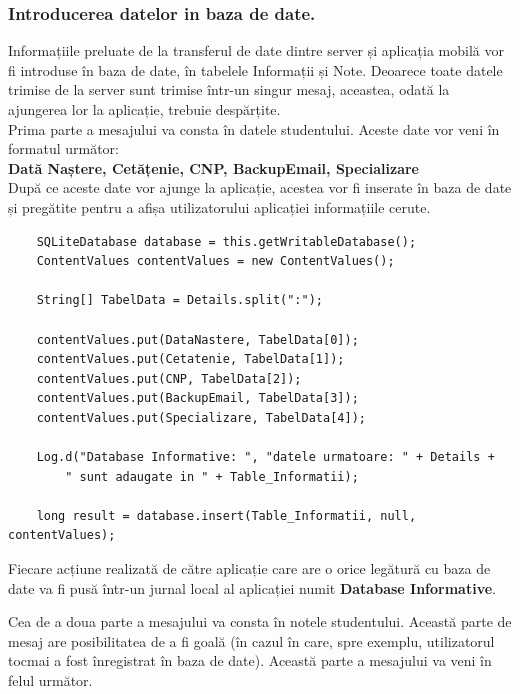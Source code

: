\documentclass{article}
\begin{document}
		\subsubsection*{Introducerea datelor in baza de date.}

	Informațiile preluate de la transferul de date dintre server și aplicația mobilă vor fi introduse în baza de date, în tabelele Informații și Note. Deoarece toate datele trimise de la server sunt trimise într-un singur mesaj, aceastea, odată la ajungerea lor la aplicație, trebuie despărțite. \\

	Prima parte a mesajului va consta în datele studentului. Aceste date vor veni în formatul următor:\\

	\textbf{Dată Naștere, Cetățenie, CNP, BackupEmail, Specializare} \\

	 După ce aceste date vor ajunge la aplicație, acestea vor fi inserate în baza de date și pregătite pentru a afișa utilizatorului aplicației informațiile cerute.

	\begin{verbatim}
    SQLiteDatabase database = this.getWritableDatabase();
    ContentValues contentValues = new ContentValues();

    String[] TabelData = Details.split(":");

    contentValues.put(DataNastere, TabelData[0]);
    contentValues.put(Cetatenie, TabelData[1]);
    contentValues.put(CNP, TabelData[2]);
    contentValues.put(BackupEmail, TabelData[3]);
    contentValues.put(Specializare, TabelData[4]);

    Log.d("Database Informative: ", "datele urmatoare: " + Details + 
        " sunt adaugate in " + Table_Informatii);

    long result = database.insert(Table_Informatii, null, contentValues);
	\end{verbatim}

	Fiecare acțiune realizată de către aplicație care are o orice legătură cu baza de date va fi pusă într-un jurnal local al aplicației numit \textbf{Database Informative}.

	Cea de a doua parte a mesajului va consta în notele studentului. Această parte de mesaj are posibilitatea de a fi goală (în cazul în care, spre exemplu, utilizatorul tocmai a fost înregistrat în baza de date). Această parte a mesajului va veni în felul următor. \\
\end{document}
